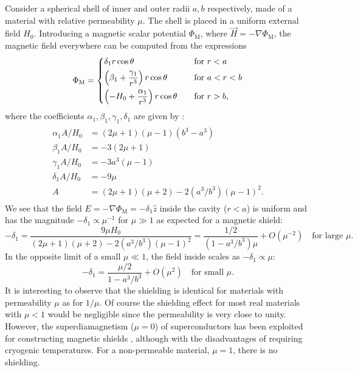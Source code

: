Consider a spherical shell of inner and outer radii $a,b$ respectively, made of
a material with relative permeability $\mu$. The shell is placed in a uniform
external field $H_0$.
%
Introducing a magnetic scalar potential $\Phi_\text{M}$, where $\vec
H=-\nabla\Phi_\text{M}$, the magnetic field everywhere can be computed from the
expressions \cite[eqns~5.117--118]{jackson1998classical}
%
\begin{align}
   \label{spherical_potential}
   \Phi_\text{M}=
    \begin{dcases*}
       \delta_1r\cos\theta&\quad for $r<a$\\
       \left(\beta_1+\frac{\gamma_1}{r^3}\right)r\cos\theta&\quad for $a<r<b$\\
       \left(-H_0+\frac{\alpha_1}{r^3}\right)r\cos\theta&\quad for $r>b$,
    \end{dcases*}
\end{align}
%
where the coefficients $\alpha_1,\beta_1,\gamma_1,\delta_1$ are given by
\cite[eqn~5.120]{jackson1998classical}:
%
\begin{align}
   \label{sphere_coeffs}
   \begin{split}
      \alpha_1A/H_0&=(2\mu+1)(\mu-1)(b^3-a^3)\\
      \beta_1 A/H_0&=-3(2\mu+1)\\
      \gamma_1A/H_0&=-3a^3(\mu-1)\\
      \delta_1A/H_0&=-9\mu\\
      A        &=(2\mu+1)(\mu+2)-2(a^3/b^3)(\mu-1)^2.
   \end{split}
\end{align}
%
We see that the field $E=-\nabla\Phi_\text{M}=-\delta_1\hat{z}$ inside the
cavity ($r<a$) is uniform and has the magnitude $-\delta_1\propto\mu^{-1}$ for
$\mu\gg1$ as expected for a magnetic shield:
%
\[
    -\delta_1=\frac{9\mu H_0}{(2\mu+1)(\mu+2)-2(a^3/b^3)(\mu-1)^2}=
    \frac{1/2}{(1-a^3/b^3)\mu}+O(\mu^{-2})
    \quad\text{for large $\mu$.}
\]
%
In the opposite limit of a small
$\mu\ll1$, the field inside scales as $-\delta_1\propto\mu$:
%
\[
    -\delta_1=\frac{\mu/2}{1-a^3/b^3}+O(\mu^2)
    \quad\text{for small $\mu$.}
\]
%
It is interesting to observe that the
shielding is identical for materials with permeability $\mu$ as for $1/\mu$. Of
course the shielding effect for most real materials with $\mu<1$ would be
negligible since the permeability is very close to unity. However, the
superdiamagnetism ($\mu=0$) of superconductors has been exploited for
constructing magnetic shields
\cite{claycomb1999superconducting,ohta1999neuromagnetic,al2021study}, although
with the disadvantages of requiring cryogenic temperatures.  For a non-permeable
material, $\mu=1$, there is no shielding.

